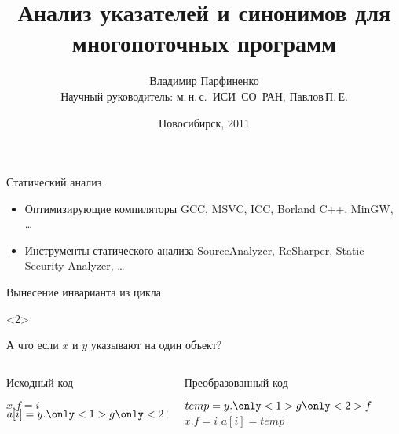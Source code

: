 \documentclass[usenames,dvipsnames,pdftex,unicode]{beamer}
\title[Анализ указателей и синонимов]{
  Анализ указателей и синонимов для многопоточных программ
}
\author[Владимир Парфиненко]{
  Владимир Парфиненко\\
  {\small Научный руководитель: м.\,н.\,с.~ИСИ~СО~РАН, Павлов\,П.\,Е.}
}
\institute{
  Новосибирский Государственный Университет
}
\date{
  Новосибирск, 2011
}
\begin{document}
\begin{frame}
  \titlepage
\end{frame}

\begin{frame}{Статический анализ}

  \begin{itemize}
    \item Оптимизирующие компиляторы\newline
        GCC, MSVC, ICC, Borland C++, MinGW, \ldots
    \item Инструменты статического анализа\newline
        SourceAnalyzer, ReSharper, Static Security Analyzer, \ldots
  \end{itemize}

\end{frame}

\begin{frame}{Вынесение инварианта из цикла}

  \begin{visibleenv}<2>
    \begin{center}
      \large А что если $x$ и $y$ указывают на один объект?
    \end{center}
  \end{visibleenv}

  \begin{columns}[t]
    \begin{column}{5cm}
      \begin{block}{Исходный код}
        \begin{algorithmic}
          \STATE
          \STATE $x.f = i$
          \STATE $a[i] = y.\only<1>{g}\only<2>{f}$
          \ENDFOR
        \end{algorithmic}
      \end{block}
    \end{column}
    \begin{column}{5cm}
      \begin{block}{Преобразованный код}
        \begin{algorithmic}
          \STATE $temp = y.\only<1>{g}\only<2>{f}$
          \STATE $x.f = i$
          \STATE $a[i] = temp$
          \ENDFOR
        \end{algorithmic}
      \end{block}
    \end{column}
  \end{columns}

\end{frame}
\end{document}
